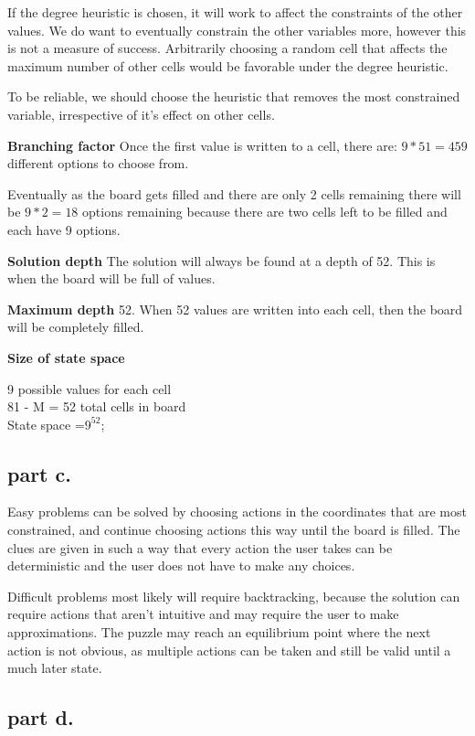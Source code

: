 If the degree heuristic is chosen, it will work to affect the constraints of the other values. We do want to eventually constrain the other variables more, however this is not a measure of success. Arbitrarily choosing a random cell that affects the maximum number of other cells would be favorable under the degree heuristic.

To be reliable, we should choose the heuristic that removes the most constrained variable, irrespective of it's effect on other cells.

\textbf{Branching factor} 
Once the first value is written to a cell, there are: $9 * 51 = 459$ different options to choose from. 

Eventually as the board gets filled and there are only 2 cells remaining there will be $9 * 2 = 18$ options remaining because there are two cells left to be filled and each have 9 options.

\textbf{Solution depth} 
The solution will always be found at a depth of 52. This is when the board will be full of values.

\textbf{Maximum depth} 
52. When 52 values are written into each cell, then the board will be completely filled.

\textbf{Size of state space} 

9 possible values for each cell \\
81 - M = 52 total cells in board \\

State space =$9 ^ {52}$;


\subsection{part c.}
Easy problems can be solved by choosing actions in the coordinates that are most constrained, and continue choosing actions this way until the board is filled. The clues are given in such a way that every action the user takes can be deterministic and the user does not have to make any choices.


Difficult problems most likely will require backtracking, because the solution can require actions that aren't intuitive and may require the user to make approximations. The puzzle may reach an equilibrium point where the next action is not obvious, as multiple actions can be taken and still be valid until a much later state.

\subsection{part d.}

